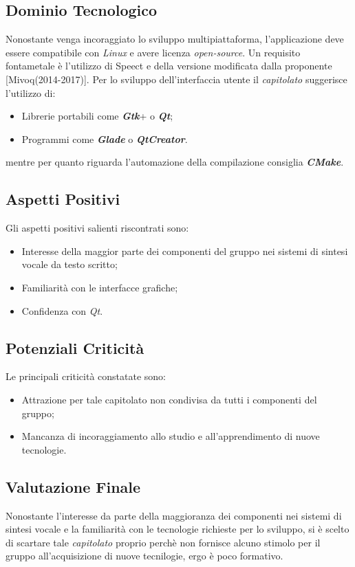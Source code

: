 \subsection{Dominio Tecnologico}
	Nonostante venga incoraggiato lo sviluppo multipiattaforma, l'applicazione deve essere compatibile con \textit{Linux} e avere licenza \textit{open-source}. Un requisito fontametale è l'utilizzo di Speect e della versione modificata dalla proponente [Mivoq(2014-2017)].
	\newline \newline Per lo sviluppo dell'interfaccia utente il \textit{capitolato} suggerisce l'utilizzo di:
	\begin{itemize}
		\item Librerie portabili come \textit{\textbf{Gtk}}+ o \textit{\textbf{Qt}};
		\item Programmi come \textit{\textbf{Glade}} o \textit{\textbf{QtCreator}}.
	\end{itemize}
	mentre per quanto riguarda l'automazione della compilazione consiglia \textit{\textbf{CMake}}.
	
\subsection{Aspetti Positivi}
	Gli aspetti positivi salienti riscontrati sono:
	\begin{itemize}
		\item Interesse della maggior parte dei componenti del gruppo nei sistemi di sintesi vocale da testo scritto;
		\item Familiarità con le interfacce grafiche;
		\item Confidenza con \textit{Qt}.
	\end{itemize}
	
\subsection{Potenziali Criticità}
	Le principali criticità constatate sono:
	\begin{itemize}
		\item Attrazione per tale capitolato non condivisa da tutti i componenti del gruppo;
		\item Mancanza di incoraggiamento allo studio e all'apprendimento di nuove tecnologie.
	\end{itemize}

\subsection{Valutazione Finale}
	Nonostante l'interesse da parte della maggioranza dei componenti nei sistemi di sintesi vocale e la familiarità con le tecnologie richieste per lo sviluppo, si è scelto di scartare tale \textit{capitolato} proprio perchè non fornisce alcuno stimolo per il gruppo all'acquisizione di nuove tecnilogie, ergo è poco formativo.